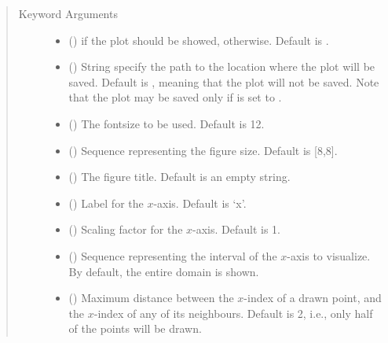 \documentclass[letterpaper,10pt,english]{sphinxmanual}
\begin{document}
\begin{fulllineitems}
\begin{quote}
\begin{description}
\begin{itemize}
\end{itemize}

\item[{Keyword Arguments}] \leavevmode\begin{itemize}
\item {} 
 () \textendash{}  if the plot should be showed,  otherwise. Default is .

\item {} 
 () \textendash{} String specify the path to the location where the plot will be saved. Default is ,
meaning that the plot will not be saved. Note that the plot may be saved only if 
is set to .

\item {} 
 () \textendash{} The fontsize to be used. Default is 12.

\item {} 
 () \textendash{} Sequence representing the figure size. Default is {[}8,8{]}.

\item {} 
 () \textendash{} The figure title. Default is an empty string.

\item {} 
 () \textendash{} Label for the \(x\)-axis. Default is ‘x’.

\item {} 
 () \textendash{} Scaling factor for the \(x\)-axis. Default is 1.

\item {} 
 () \textendash{} Sequence representing the interval of the \(x\)-axis to visualize.
By default, the entire domain is shown.

\item {} 
 () \textendash{} Maximum distance between the \(x\)-index of a drawn point, and the \(x\)-index of any
of its neighbours. Default is 2, i.e., only half of the points will be drawn.


\end{itemize}
\end{description}
\end{quote}
\end{fulllineitems}
\end{document}
